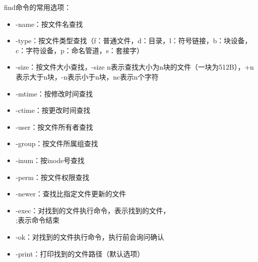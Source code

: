 \documentclass[12pt,UTF8]{ctexbook}
\begin{document}
find命令的常用选项：
\begin{itemize}
    \item -name：按文件名查找
    \item -type：按文件类型查找（f：普通文件，d：目录，l：符号链接，b：块设备，c：字符设备，p：命名管道，s：套接字）
    \item -size：按文件大小查找，-size n表示查找大小为n块的文件（一块为512B），+n表示大于n块，-n表示小于n块，nc表示n个字符
    \item -mtime：按修改时间查找
    \item -ctime：按更改时间查找
    \item -user：按文件所有者查找
    \item -group：按文件所属组查找
    \item -inum：按inode号查找
    \item -perm：按文件权限查找
    \item -newer：查找比指定文件更新的文件
    \item -exec：对找到的文件执行命令，{}表示找到的文件，\\;表示命令结束
    \item -ok：对找到的文件执行命令，执行前会询问确认
    \item -print：打印找到的文件路径（默认选项）
\end{itemize}
\end{document}

